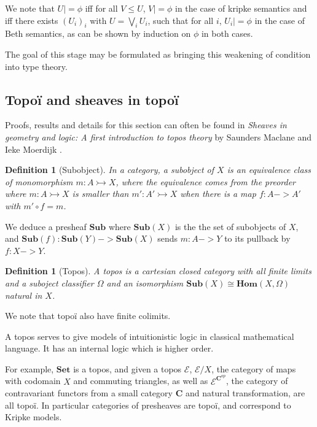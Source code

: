 \documentclass[11pt]{article}
\newtheorem{definition}[theorem]{Definition}
\newcommand{\0}{\mathbf{0}}
\newcommand{\1}{\mathbf{1}}
\newcommand{\mono}{\rightarrowtail}
\begin{document}
We note that $U |= \phi$ iff for all $V\leq U$, $V |= \phi$ in the case of kripke semantics and iff there exists $(U_i)_i$ with $U = \bigvee_i U_i$, such that for all $i$, $U_i |= \phi$ in the case of Beth semantics, as can be shown by induction on $\phi$ in both cases.

The goal of this stage may be formulated as bringing this weakening of condition into type theory.

\subsection{Topoï and sheaves in topoï}


Proofs, results and details for this section can often be found in \emph{Sheaves in geometry and logic: A first introduction to topos theory} by Saunders Maclane and Ieke Moerdijk \cite{maclane2012sheaves}.

\begin{definition}[Subobject]
    In a category, a \emph{subobject} of $X$ is an equivalence class of monomorphism $m : A \mono X$, where the equivalence comes from the preorder where $ m : A \mono X $ is smaller than $ m' : A' \mono X$ when there is a map $f : A -> A'$ with $ m' \circ f = m$.
\end{definition}

We deduce a presheaf $\mathbf{Sub}$ where $\mathbf{Sub}(X)$ is the the set of subobjects of $X$, and $\mathbf{Sub}(f) : \mathbf{Sub}(Y) -> \mathbf{Sub}(X)$ sends $m : A -> Y$ to its pullback by $f : X -> Y $. 

\begin{definition}[Topos]\label{topos}
    A \emph{topos} is a cartesian closed category with all finite limits and a suboject \emph{classifier} $\Omega$ and an isomorphism $\mathbf{Sub}(X)\cong \mathbf{Hom}(X, \Omega)$ natural in $X$.
\end{definition}

We note that topoï also have finite colimits.

A topos serves to give models of intuitionistic logic in classical mathematical language. It has an internal logic which is higher order.

For example, $\mathbf{Set}$ is a topos, and given a topos $\mathcal E$, $\mathcal{E}/X$, the category of maps with codomain $X$ and commuting triangles, as well as $\mathcal{E}^{\mathbf{C}^{op}}$, the category of contravariant functors from a small category $\mathbf{C}$ and natural transformation, are all topoï. In particular categories of presheaves are topoï, and correspond to Kripke models. 
\end{document}
